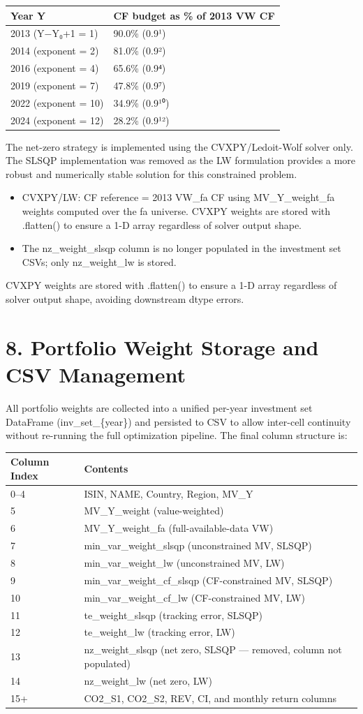 \documentclass[
  11pt,
]{article}
\begin{document}
\begin{longtable}[]{@{}ll@{}}
\toprule
\textbf{Year Y} & \textbf{CF budget as \% of 2013 VW CF}\tabularnewline
\midrule
\endhead
2013 (Y−Y₀+1 = 1) & 90.0\% (0.9¹)\tabularnewline
2014 (exponent = 2) & 81.0\% (0.9²)\tabularnewline
2016 (exponent = 4) & 65.6\% (0.9⁴)\tabularnewline
2019 (exponent = 7) & 47.8\% (0.9⁷)\tabularnewline
2022 (exponent = 10) & 34.9\% (0.9¹⁰)\tabularnewline
2024 (exponent = 12) & 28.2\% (0.9¹²)\tabularnewline
\bottomrule
\end{longtable}

The net-zero strategy is implemented using the CVXPY/Ledoit-Wolf solver
only. The SLSQP implementation was removed as the LW formulation
provides a more robust and numerically stable solution for this
constrained problem.

\begin{itemize}
\item
  CVXPY/LW: CF reference = 2013 VW\_fa CF using MV\_Y\_weight\_fa
  weights computed over the fa universe. CVXPY weights are stored with
  .flatten() to ensure a 1-D array regardless of solver output shape.
\item
  The nz\_weight\_slsqp column is no longer populated in the investment
  set CSVs; only nz\_weight\_lw is stored.
\end{itemize}

CVXPY weights are stored with .flatten() to ensure a 1-D array
regardless of solver output shape, avoiding downstream dtype errors.

\hypertarget{portfolio-weight-storage-and-csv-management}{%
\section{8. Portfolio Weight Storage and CSV
Management}\label{portfolio-weight-storage-and-csv-management}}

All portfolio weights are collected into a unified per-year investment
set DataFrame (inv\_set\_\{year\}) and persisted to CSV to allow
inter-cell continuity without re-running the full optimization pipeline.
The final column structure is:

\begin{longtable}[]{@{}ll@{}}
\toprule
\textbf{Column Index} & \textbf{Contents}\tabularnewline
\midrule
\endhead
0--4 & ISIN, NAME, Country, Region, MV\_Y\tabularnewline
5 & MV\_Y\_weight (value-weighted)\tabularnewline
6 & MV\_Y\_weight\_fa (full-available-data VW)\tabularnewline
7 & min\_var\_weight\_slsqp (unconstrained MV, SLSQP)\tabularnewline
8 & min\_var\_weight\_lw (unconstrained MV, LW)\tabularnewline
9 & min\_var\_weight\_cf\_slsqp (CF-constrained MV,
SLSQP)\tabularnewline
10 & min\_var\_weight\_cf\_lw (CF-constrained MV, LW)\tabularnewline
11 & te\_weight\_slsqp (tracking error, SLSQP)\tabularnewline
12 & te\_weight\_lw (tracking error, LW)\tabularnewline
13 & nz\_weight\_slsqp (net zero, SLSQP --- removed, column not
populated)\tabularnewline
14 & nz\_weight\_lw (net zero, LW)\tabularnewline
15+ & CO2\_S1, CO2\_S2, REV, CI, and monthly return
columns\tabularnewline
\bottomrule
\end{longtable}
\end{document}
